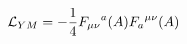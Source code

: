 \begin{equation}
{\cal{L}}_{YM} = -{\frac{1}{4}} {F_{\mu \nu}}^a (A)
{F_{a}}^{\mu \nu} (A)     
\end{equation}

